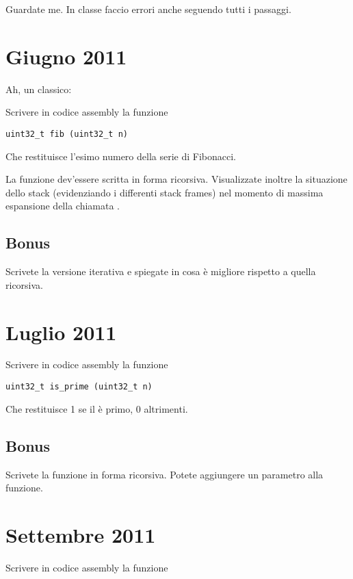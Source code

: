 \documentclass[a4paper]{memoir}
\begin{document}
	Guardate me. In classe faccio errori anche seguendo tutti i passaggi.
	
	\section{Giugno 2011}
    Ah, un classico:
    
    Scrivere in codice assembly la funzione
    
    \begin{lstlisting}
uint32_t fib (uint32_t n)
    \end{lstlisting}
    
    Che restituisce l'esimo numero della serie di Fibonacci.
    
    La funzione dev'essere scritta in forma ricorsiva. Visualizzate inoltre la situazione dello stack (evidenziando i
    differenti stack frames) nel momento di massima espansione della chiamata .
    
    \subsection{Bonus}
    
      Scrivete la versione iterativa e spiegate in cosa è migliore rispetto a quella ricorsiva.
      
	\section{Luglio 2011}
	
	  Scrivere in codice assembly la funzione
    
    \begin{lstlisting}
uint32_t is_prime (uint32_t n)
    \end{lstlisting}
    
    Che restituisce 1 se il  è primo, 0 altrimenti.
    
    \subsection{Bonus}
    
      Scrivete la funzione in forma ricorsiva. Potete aggiungere un parametro alla funzione.
      
  \section{Settembre 2011}
    Scrivere in codice assembly la funzione
    
\end{document}
